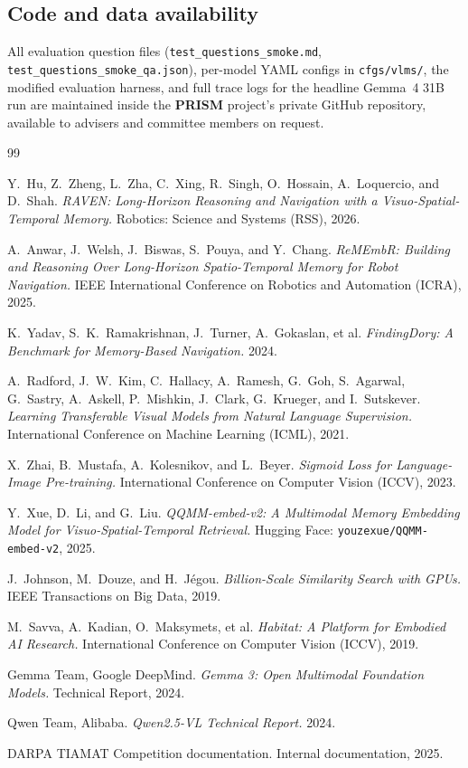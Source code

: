 \documentclass[12pt,letterpaper,oneside]{article}
\begin{document}
\subsection*{Code and data availability}
All evaluation question files
(\texttt{test\_questions\_smoke.md},
\texttt{test\_questions\_smoke\_qa.json}), per-model YAML configs in
\texttt{cfgs/vlms/}, the modified evaluation harness, and full trace
logs for the headline Gemma~4 31B run are maintained inside the
\textbf{PRISM} project's private GitHub repository, available to
advisers and committee members on request.

\begin{thebibliography}{99}
\small

Y.~Hu, Z.~Zheng, L.~Zha, C.~Xing, R.~Singh, O.~Hossain, A.~Loquercio,
and D.~Shah.
\emph{RAVEN: Long-Horizon Reasoning and Navigation with a
  Visuo-Spatial-Temporal Memory.}
Robotics: Science and Systems (RSS), 2026.

A.~Anwar, J.~Welsh, J.~Biswas, S.~Pouya, and Y.~Chang.
\emph{ReMEmbR: Building and Reasoning Over Long-Horizon
  Spatio-Temporal Memory for Robot Navigation.}
IEEE International Conference on Robotics and Automation (ICRA), 2025.

K.~Yadav, S.~K.~Ramakrishnan, J.~Turner, A.~Gokaslan, et al.
\emph{FindingDory: A Benchmark for Memory-Based Navigation.}
2024.

A.~Radford, J.~W.~Kim, C.~Hallacy, A.~Ramesh, G.~Goh, S.~Agarwal,
G.~Sastry, A.~Askell, P.~Mishkin, J.~Clark, G.~Krueger, and
I.~Sutskever.
\emph{Learning Transferable Visual Models from Natural Language
  Supervision.}
International Conference on Machine Learning (ICML), 2021.

X.~Zhai, B.~Mustafa, A.~Kolesnikov, and L.~Beyer.
\emph{Sigmoid Loss for Language-Image Pre-training.}
International Conference on Computer Vision (ICCV), 2023.

Y.~Xue, D.~Li, and G.~Liu.
\emph{QQMM-embed-v2: A Multimodal Memory Embedding Model for
  Visuo-Spatial-Temporal Retrieval.}
Hugging Face: \texttt{youzexue/QQMM-embed-v2}, 2025.

J.~Johnson, M.~Douze, and H.~J\'egou.
\emph{Billion-Scale Similarity Search with GPUs.}
IEEE Transactions on Big Data, 2019.

M.~Savva, A.~Kadian, O.~Maksymets, et al.
\emph{Habitat: A Platform for Embodied AI Research.}
International Conference on Computer Vision (ICCV), 2019.

Gemma Team, Google DeepMind.
\emph{Gemma 3: Open Multimodal Foundation Models.}
Technical Report, 2024.

Qwen Team, Alibaba.
\emph{Qwen2.5-VL Technical Report.}
2024.

DARPA TIAMAT Competition documentation.  Internal documentation, 2025.

\end{thebibliography}
\end{document}
